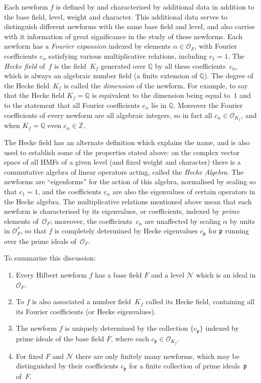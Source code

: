 \documentclass{llncs}
\def\Z{{\mathbb Z}}
\def\Q{{\mathbb Q}}
\def\N{{\mathcal{N}}}
\def\O{{\mathcal{O}}}
\def\p{{\mathfrak{p}}}
\begin{document}
Each newform $f$ is defined by and characterised by additional data in
addition to the base field, level, weight and character.  This
additional data serves to distinguish different newforms with the same
base field and level, and also carries with it information of great
significance in the study of these newforms.  Each newform has a
\emph{Fourier expansion} indexed by elements $\alpha\in\O_F$, with
Fourier coefficients $c_{\alpha}$ satisfying various multiplicative
relations, including $c_1=1$.  The \emph{Hecke field} of~$f$ is the
field~$K_f$ generated over $\Q$ by all these
coefficients~$c_{\alpha}$, which is always an algebraic number field
(a finite extension of $\Q$).  The degree of the Hecke field~$K_f$ is
called the \emph{dimension} of the newform.  For example, to say that
the Hecke field $K_f=\Q$ is equivalent to the dimension being equal
to~$1$ and to the statement that all Fourier coefficients $c_{\alpha}$
lie in $\Q$.  Moreover the Fourier coefficients of every newform are
all algebraic integers, so in fact all $c_{\alpha}\in\O_{K_f}$, and
when $K_f=\Q$ even $c_{\alpha}\in\Z$.

The Hecke field has an alternate definition which explains the name,
and is also used to establish some of the properties stated above: on
the complex vector space of all HMFs of a given level (and fixed
weight and character) there is a commutative algebra of linear
operators acting, called the \emph{Hecke Algebra}.  The newforms are
``eigenforms'' for the action of this algebra, normalised by scaling
so that $c_1=1$, and the coefficients $c_{\alpha}$ are also the
eigenvalues of certain operators in the Hecke algebra.  The
multiplicative relations mentioned above mean that each newform is
characterised by its eigenvalues, or coefficients, indexed by
\emph{prime} elements of~$\O_F$; moreover, the
coefficients~$c_{\alpha}$ are unaffected by scaling $\alpha$ by units
in $\O_F^*$, so that $f$ is completely determined by Hecke eigenvalues
$c_{\p}$ for $\p$ running over the prime ideals of~$\O_F$.

To summarize this discussion:
\begin{enumerate}
\item Every Hilbert newform $f$ has a base field $F$ and a level $\N$
  which is an ideal in $\O_F$.
\item To $f$ is also associated a number field~$K_f$ called its Hecke
  field, containing all its Fourier coefficients (or Hecke
  eigenvalues).
\item The newform $f$ is uniquely determined by the collection
  $\{c_\p\}$ indexed by prime ideals of the base field $F$, where each
  $c_{\p}\in\O_{K_f}$.
\item For fixed $F$ and $\N$ there are only finitely many newforms,
  which may be distinguished by their coefficients $c_\p$ for a finite
  collection of prime ideals~$\p$ of~$F$.
\end{enumerate}
\end{document}
